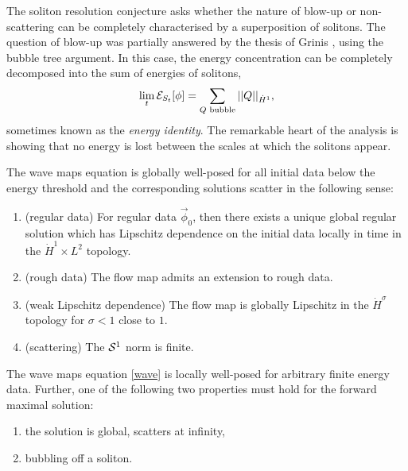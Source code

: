 \begin{remark}
	The soliton resolution conjecture asks whether the nature of blow-up or non-scattering can be completely characterised by a superposition of solitons. The question of blow-up was partially answered by the thesis of Grinis \cite{Grinis2016}, using the bubble tree argument. In this case, the energy concentration can be completely decomposed into the sum of energies of solitons,
		\[
			\lim_{t} \mathcal E_{S_t} [\phi] = \sum_{Q \text{ bubble}} ||Q||_{\dot H^1}, 
		\]
	 sometimes known as the \emph{energy identity}. The remarkable heart of the analysis is showing that no energy is lost between the scales at which the solitons appear.  
\end{remark}

\begin{theorem}
	The wave maps equation is globally well-posed for all initial data below the energy threshold and the corresponding solutions scatter in the following sense:
	\begin{enumerate}
		\item (regular data) For regular data $\vec \phi_0$, then there exists a unique global regular solution which has Lipschitz dependence on the initial data locally in time in the $\dot H^1 \times L^2$ topology. 
		
		\item (rough data) The flow map admits an extension to rough data. 
		
		\item (weak Lipschitz dependence) The flow map is globally Lipschitz in the $\dot H^{\sigma}$ topology for $\sigma < 1$ close to $1$. 
		
		\item (scattering) The $\mathcal S^1$ norm is finite.
	\end{enumerate}	
\end{theorem}

\begin{theorem}
	The wave maps equation \eqref{wave} is locally well-posed for arbitrary finite energy data. Further, one of the following two properties must hold for the forward maximal solution:
	\begin{enumerate}
		\item the solution is global, scatters at infinity,
		\item bubbling off a soliton. 
	\end{enumerate}
\end{theorem}

